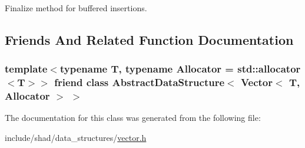 Finalize method for buffered insertions. 



\subsection{Friends And Related Function Documentation}
\hypertarget{classshad_1_1Vector_ac9d0ae866fc73cd8c7637ff2691c13bb}{
\subsubsection[{Abstract\-Data\-Structure$<$ Vector$<$ T, Allocator $>$ $>$}]{\setlength{\rightskip}{0pt plus 5cm}template$<$typename T, typename Allocator = std\-::allocator$<$\-T$>$$>$ friend class {\bf Abstract\-Data\-Structure}$<$ {\bf Vector}$<$ T, Allocator $>$ $>$\hspace{0.3cm}{\ttfamily [friend]}}}\label{classshad_1_1Vector_ac9d0ae866fc73cd8c7637ff2691c13bb}


The documentation for this class was generated from the following file\-:\begin{DoxyCompactItemize}
\item 
include/shad/data\-\_\-structures/\hyperlink{vector_8h}{vector.\-h}\end{DoxyCompactItemize}
